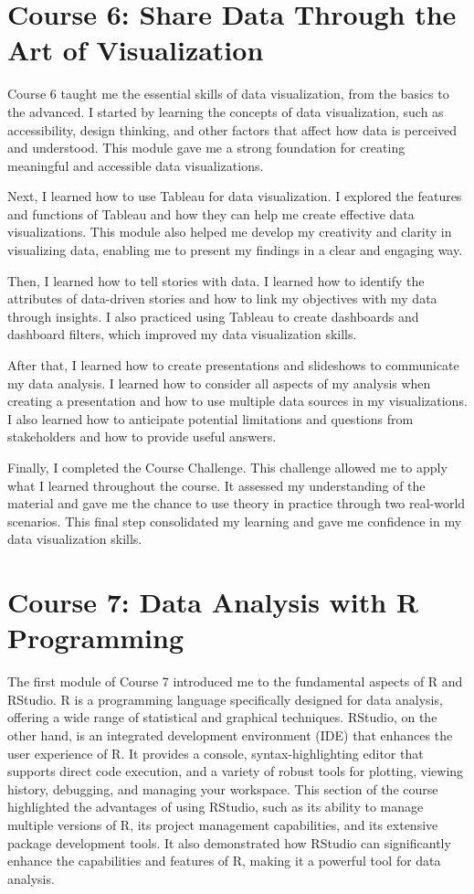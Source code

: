 \documentclass[]{article}
\begin{document}
\section{Course 6: Share Data Through the Art of Visualization}
Course 6 taught me the essential skills of data visualization, from the basics to the advanced. I started by learning the concepts of data visualization, such as accessibility, design thinking, and other factors that affect how data is perceived and understood. This module gave me a strong foundation for creating meaningful and accessible data visualizations.

Next, I learned how to use Tableau for data visualization. I explored the features and functions of Tableau and how they can help me create effective data visualizations. This module also helped me develop my creativity and clarity in visualizing data, enabling me to present my findings in a clear and engaging way.

Then, I learned how to tell stories with data. I learned how to identify the attributes of data-driven stories and how to link my objectives with my data through insights. I also practiced using Tableau to create dashboards and dashboard filters, which improved my data visualization skills.

After that, I learned how to create presentations and slideshows to communicate my data analysis. I learned how to consider all aspects of my analysis when creating a presentation and how to use multiple data sources in my visualizations. I also learned how to anticipate potential limitations and questions from stakeholders and how to provide useful answers.

Finally, I completed the Course Challenge. This challenge allowed me to apply what I learned throughout the course. It assessed my understanding of the material and gave me the chance to use theory in practice through two real-world scenarios. This final step consolidated my learning and gave me confidence in my data visualization skills.

\section{Course 7: Data Analysis with R Programming}
The first module of Course 7 introduced me to the fundamental aspects of R and RStudio. R is a programming language specifically designed for data analysis, offering a wide range of statistical and graphical techniques. RStudio, on the other hand, is an integrated development environment (IDE) that enhances the user experience of R. It provides a console, syntax-highlighting editor that supports direct code execution, and a variety of robust tools for plotting, viewing history, debugging, and managing your workspace. This section of the course highlighted the advantages of using RStudio, such as its ability to manage multiple versions of R, its project management capabilities, and its extensive package development tools. It also demonstrated how RStudio can significantly enhance the capabilities and features of R, making it a powerful tool for data analysis.
\end{document}
